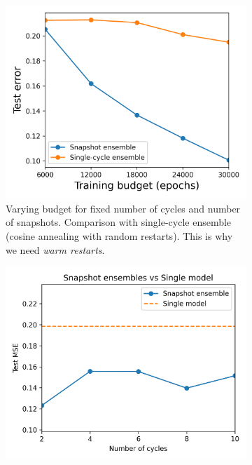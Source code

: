 \begin{figure}[H]
	\begin{subfigure}{.45\textwidth}
		\centering
		\includegraphics[width=1\linewidth]{./figs/vary_b.png}  
		\caption{Varying budget for fixed number of cycles and number of snapshots. Comparison with single-cycle ensemble (cosine annealing with random restarts). This is why we need \textit{warm restarts}.}
		\label{fig:sub-first}
	\end{subfigure}
	\begin{subfigure}{.45\textwidth}
		\centering
		\includegraphics[width=1\linewidth]{./figs/vary_ac.png}  

\end{subfigure}
\end{figure}
